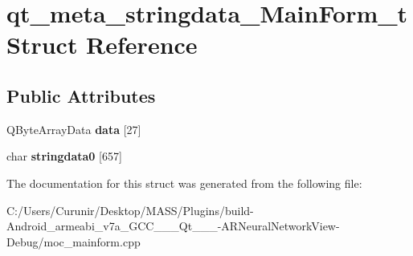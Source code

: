\hypertarget{structqt__meta__stringdata___main_form__t}{}\section{qt\+\_\+meta\+\_\+stringdata\+\_\+\+Main\+Form\+\_\+t Struct Reference}
\label{structqt__meta__stringdata___main_form__t}
\subsection*{Public Attributes}
\begin{DoxyCompactItemize}
\item 
\mbox{\label{structqt__meta__stringdata___main_form__t_a1a8f598d6885fd1a696eaae7d68598d3}} 
Q\+Byte\+Array\+Data {\bfseries data} \mbox{[}27\mbox{]}
\item 
\mbox{\label{structqt__meta__stringdata___main_form__t_a26bf47946070ce2d2d8f2f7da78cc4dc}} 
char {\bfseries stringdata0} \mbox{[}657\mbox{]}
\end{DoxyCompactItemize}


The documentation for this struct was generated from the following file\+:\begin{DoxyCompactItemize}
\item 
C\+:/\+Users/\+Curunir/\+Desktop/\+M\+A\+S\+S/\+Plugins/build-\/\+Android\+\_\+armeabi\+\_\+v7a\+\_\+\+G\+C\+C\+\_\+\_\+\_\+\+Qt\+\_\+\_\+\_-\/\+A\+R\+Neural\+Network\+View-\/\+Debug/moc\+\_\+mainform.\+cpp\end{DoxyCompactItemize}

